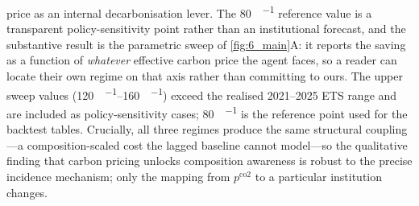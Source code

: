 \documentclass[11pt]{article}
\begin{document}
price as an internal decarbonisation lever. The \SI{80}{\EUR\per\tCOtwo}
reference value is a transparent policy-sensitivity point rather than an
institutional forecast, and the substantive result is the parametric sweep of
\cref{fig:6_main}A: it reports the saving as a function of \emph{whatever}
effective carbon price the agent faces, so a reader can locate their own regime
on that axis rather than committing to ours. The upper sweep values
(\SIrange{120}{160}{\EUR\per\tCOtwo}) exceed the realised 2021--2025 ETS range
and are included as policy-sensitivity cases; \SI{80}{\EUR\per\tCOtwo} is the
reference point used for the backtest tables. Crucially, all three regimes
produce the same structural coupling---a composition-scaled cost the lagged
baseline cannot model---so the qualitative finding that carbon pricing unlocks
composition awareness is robust to the precise incidence mechanism; only the
mapping from $p^{\text{co2}}$ to a particular institution changes.

%
%
\end{document}
